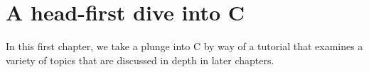 \chapter{A head-first dive into C}

In this first chapter, we take a plunge into C by way of a tutorial that examines a variety of topics that are discussed in depth in later chapters.  


